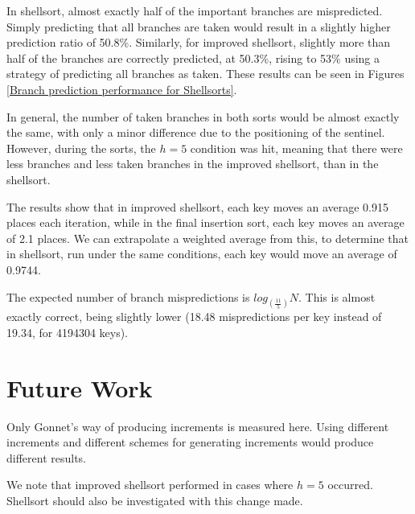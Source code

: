 
In shellsort, almost exactly half of the important branches are mispredicted.
Simply predicting that all branches are taken would result in a slightly higher
prediction ratio of 50.8\%. Similarly, for improved shellsort, slightly more
than half of the branches are correctly predicted, at 50.3\%, rising to 53\%
using a strategy of predicting all branches as taken. These results can be seen
in Figures \ref{Branch prediction performance for Shellsorts}.

In general, the number of taken branches in both sorts would be almost exactly
the same, with only a minor difference due to the positioning of the sentinel.
However, during the sorts, the $h = 5$ condition was hit, meaning that there
were less branches and less taken branches in the improved shellsort, than in
the shellsort.

The results show that in improved shellsort, each key moves an average 0.915
places each iteration, while in the final insertion sort, each key moves an
average of 2.1 places. We can extrapolate a weighted average from this, to
determine that in shellsort, run under the same conditions, each key would move
an average of 0.9744.

The expected number of branch mispredictions is $log_{(\frac{11}{5})}N$. This
is almost exactly correct, being slightly lower (18.48 mispredictions per key
instead of 19.34, for 4194304 keys).


\section{Future Work}

Only Gonnet's way of producing increments is measured here. Using different
increments and different schemes for generating increments would produce
different results.

We note that improved shellsort performed in cases where $h = 5$ occurred.
Shellsort should also be investigated with this change made.
